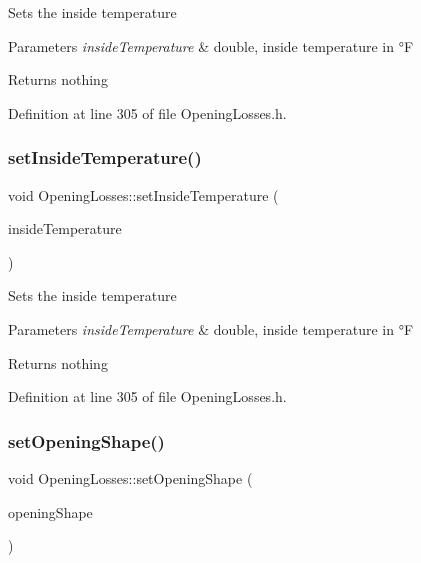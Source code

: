 Sets the inside temperature


\begin{DoxyParams}{Parameters}
{\em inside\+Temperature} & double, inside temperature in °F\\
\hline
\end{DoxyParams}
\begin{DoxyReturn}{Returns}
nothing 
\end{DoxyReturn}


Definition at line 305 of file Opening\+Losses.\+h.

\mbox{\label{class_opening_losses_a895dcaa81bbb3dc823ec903480f05262}} 
\subsubsection{\texorpdfstring{set\+Inside\+Temperature()}{setInsideTemperature()}\hspace{0.1cm}{\footnotesize\ttfamily [3/3]}}
{\footnotesize\ttfamily void Opening\+Losses\+::set\+Inside\+Temperature (\begin{DoxyParamCaption}\item[{double}]{inside\+Temperature }\end{DoxyParamCaption})\hspace{0.3cm}{\ttfamily [inline]}}

Sets the inside temperature


\begin{DoxyParams}{Parameters}
{\em inside\+Temperature} & double, inside temperature in °F\\
\hline
\end{DoxyParams}
\begin{DoxyReturn}{Returns}
nothing 
\end{DoxyReturn}


Definition at line 305 of file Opening\+Losses.\+h.

\mbox{\label{class_opening_losses_a163778704e5bdd1809d05118504da027}} 
\subsubsection{\texorpdfstring{set\+Opening\+Shape()}{setOpeningShape()}\hspace{0.1cm}{\footnotesize\ttfamily [1/3]}}
{\footnotesize\ttfamily void Opening\+Losses\+::set\+Opening\+Shape (\begin{DoxyParamCaption}\item[{\hyperlink{class_opening_losses_a57f9759b6fd72a1b75aa885800e26157}{Opening\+Shape}}]{opening\+Shape }\end{DoxyParamCaption})\hspace{0.3cm}{\ttfamily [inline]}}

